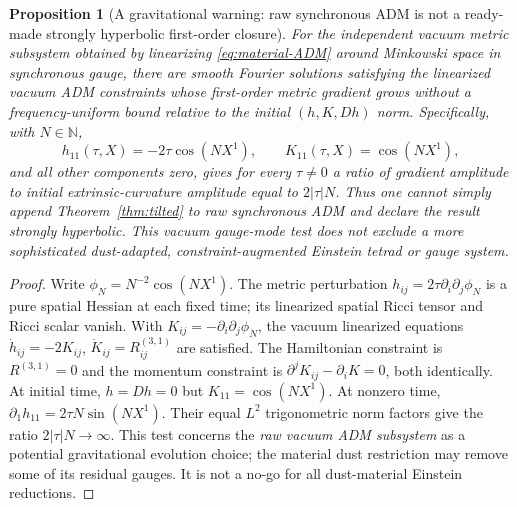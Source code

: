 \documentclass[11pt,a4paper]{article}
\newtheorem{proposition}{Proposition}
\begin{document}
\begin{proposition}[A gravitational warning:
raw synchronous ADM is not a ready-made
strongly hyperbolic first-order closure]
\label{prop:gaussian}
For the independent \emph{vacuum} metric
subsystem obtained by linearizing
\eqref{eq:material-ADM} around Minkowski
space in synchronous gauge,
there are smooth Fourier solutions
satisfying the linearized vacuum ADM
constraints whose first-order metric
gradient grows without a
frequency-uniform bound relative to
the initial $(h,K,Dh)$ norm.
Specifically, with $N\in\mathbb N$,
\begin{equation}\label{eq:gaugemode}
h_{11}(\tau,X)=-2\tau\cos(NX^1),\qquad
K_{11}(\tau,X)=\cos(NX^1),
\end{equation}
and all other components zero,
gives for every $\tau\ne0$
a ratio of gradient amplitude to
initial extrinsic-curvature amplitude
equal to $2|\tau|N$. Thus one
cannot simply append
Theorem~\ref{thm:tilted} to \emph{raw}
synchronous ADM and declare the
result strongly hyperbolic.
This vacuum gauge-mode test does not
exclude a more sophisticated
dust-adapted, constraint-augmented
Einstein tetrad or gauge system.
\end{proposition}
\begin{proof}
Write $\phi_N=N^{-2}\cos(NX^1)$.
The metric perturbation
$h_{ij}=2\tau\partial_i\partial_j\phi_N$
is a pure spatial Hessian at each
fixed time; its linearized spatial
Ricci tensor and Ricci scalar vanish.
With $K_{ij}=-\partial_i\partial_j\phi_N$,
the vacuum linearized equations
$\dot h_{ij}=-2K_{ij}$,
$\dot K_{ij}=R^{(3,1)}_{ij}$
are satisfied.
The Hamiltonian constraint is
$R^{(3,1)}=0$ and the momentum
constraint is
$\partial^jK_{ij}-\partial_iK=0$,
both identically.
At initial time, $h=Dh=0$
but $K_{11}=\cos(NX^1)$.
At nonzero time,
$\partial_1h_{11}=2\tau N\sin(NX^1)$.
Their equal $L^2$ trigonometric
norm factors give the ratio
$2|\tau|N\to\infty$.
This test concerns the \emph{raw
vacuum ADM subsystem} as a potential
gravitational evolution choice;
the material dust restriction may
remove some of its residual gauges.
It is not a no-go for all
dust-material Einstein reductions.
\end{proof}
\end{document}
